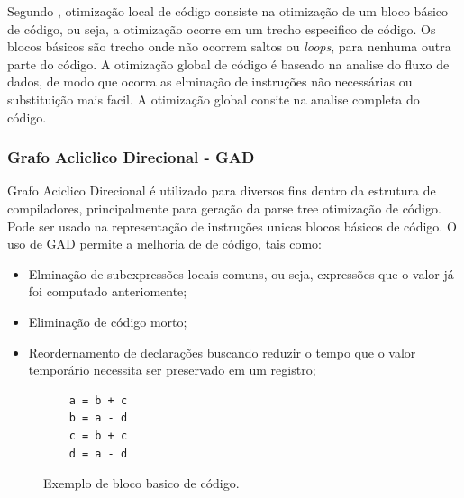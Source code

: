 \par
Segundo \cite{aho2007compilers}, otimização local de código consiste na otimização de um bloco básico de código, ou seja, a otimização ocorre em um trecho especifico de código. Os blocos básicos são trecho onde não ocorrem saltos ou \textit{loops}, para nenhuma outra parte do código. A otimização global de código é baseado na analise do fluxo de dados, de modo que ocorra as elminação de instruções não necessárias ou substituição mais facil. A otimização global consite na analise completa do código.

\subsubsection{Grafo Acliclico Direcional - GAD}
\par
Grafo Aciclico Direcional é utilizado para diversos fins dentro da estrutura de compiladores, principalmente para geração da parse tree otimização de código. Pode ser usado na representação de instruções unicas blocos básicos de código\cite{aho2007compilers}. O uso de GAD permite a melhoria de de código, tais como:
\begin{itemize}
\item Elminação de subexpressões locais comuns, ou seja, expressões que o valor já foi computado anteriomente;
\item Eliminação de código morto;
\item  Reordernamento de declarações buscando reduzir o tempo que o valor temporário necessita ser preservado em um registro;
\end{itemize}

\par
\begin{figure}[thp]
\caption{\label{fig:basic_block} Exemplo de bloco basico de código.}
	\begin{center}
    \begin{minipage}{0.9\textwidth}
    \begin{lstlisting}
    a = b + c
    b = a - d
    c = b + c
    d = a - d
	\end{lstlisting}
    \end{minipage}
	\end{center}
\end{figure}

